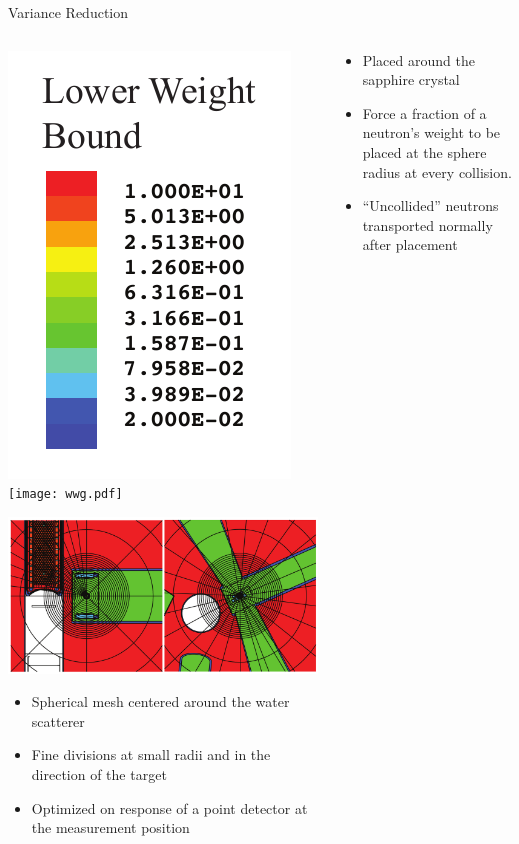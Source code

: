 \documentclass[final,t]{beamer}
\begin{document}
\begin{frame}{}
\begin{columns}[t]
\begin{column}{.3\linewidth}
\begin{block}{Variance Reduction}
      \begin{columns}

      \begin{column}{0.5\linewidth}

      \begin{center}
      \includegraphics*[width=.15\linewidth]{wwg_key.pdf} \texttt{[image: wwg.pdf]}

      \includegraphics*[width=\linewidth]{wwg_mesh.pdf}
      \end{center}

      \begin{itemize}
      \item Spherical mesh centered around the water scatterer 
      \item Fine divisions at small radii and in the direction of the target 
      \item Optimized on response of a point detector at the measurement position
      \end{itemize}

      \end{column}


      \begin{column}{0.5\linewidth}

      \begin{itemize}
      \item Placed around the sapphire crystal 
      \item Force a fraction of a neutron's weight to be placed at the sphere radius at every collision.
      \item ``Uncollided'' neutrons transported normally after placement \cite{mcnpx270}
      \end{itemize}


\end{column}
\end{columns}
\end{block}
\end{column}
\end{columns}
\end{frame}
\end{document}
